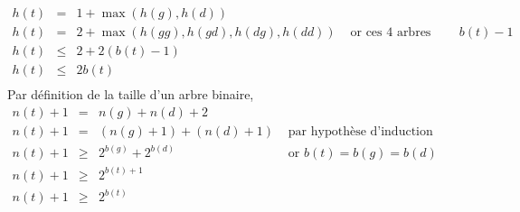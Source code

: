 \documentclass[11pt,a4paper]{article}
\begin{document}
\begin{itemize}
\begin{itemize}
            $\begin{array}{llll}
                h(t) & = & 1 + \max(h(g),h(d)) & \\
                h(t) & = & 2 + \max(h(gg),h(gd),h(dg),h(dd)) & \text{ or ces 4 arbres ontmême hauteur noire : } b(t)-1\\
                h(t) & \leqslant & 2 + 2 (b(t)-1) & \\
                h(t) & \leqslant & 2b(t) & \\
            \end{array}$
            Par définition de la taille d'un arbre binaire, \\
                $\begin{array}{llll}
				    n(t) + 1 & =         & n(g) + n(d) + 2         & \\
                    n(t) + 1 & =         & (n(g)+1) + (n(d)+1)     & \text{ par hypothèse d'induction }\\
				    n(t) + 1 & \geqslant & 2^{b(g)} + 2^{b(d)}     & \text{ or } b(t) = b(g) = b(d)\\ 
                    n(t) + 1 & \geqslant & 2^{b(t)+1}     &\\
                    n(t) + 1 & \geqslant & 2^{b(t)}     &\\
                \end{array}$
	      \end{itemize}
\end{itemize}
\end{document}

